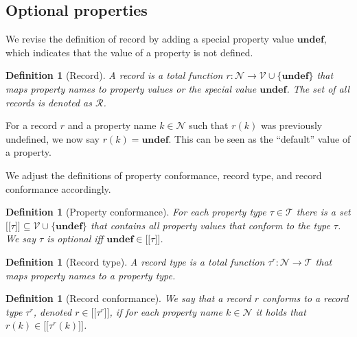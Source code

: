 \documentclass[a4paper]{article}
\newtheorem{definition}[theorem]{Definition}
\newcommand{\ptype}{\tau}
\newcommand{\ptypes}{\mathcal{T}}
\newcommand{\rtype}{\tau^r}
\newcommand{\lsem}{\ensuremath{[\![}}
\newcommand{\rsem}{\ensuremath{]\!]}}
\newcommand{\sem}[1]{\ensuremath{\lsem #1 \rsem}}
\newcommand{\undefined}{\mathbf{undef}}
\begin{document}
\subsection{Optional properties}

We revise the definition of record by adding a special property value $\undefined$, which indicates that the value of a property is not defined.

\begin{definition}[Record]
  A \emph{record} is a total function $r : \mathcal{N} \to \mathcal{V} \cup \{\undefined\}$ that maps property names to property values or the special value $\undefined$. The set of all records is denoted as $\mathcal{R}$.
\end{definition}

For a record $r$ and a property name $k \in \mathcal{N}$ such that $r(k)$ was previously undefined, we now say $r(k) = \undefined$. This can be seen as the ``default'' value of a property.

We adjust the definitions of property conformance, record type, and record conformance accordingly.

\begin{definition}[Property conformance]
  For each property type $\ptype \in \ptypes$ there is a set $\sem{\ptype} \subseteq \mathcal{V} \cup \{\undefined\}$ that contains all property values that \emph{conform} to the type $\ptype$. We say $\ptype$ is \emph{optional} iff $\undefined \in \sem{\ptype}$.
\end{definition}

\begin{definition}[Record type]
  A \emph{record type} is a total function $\rtype : \mathcal{N} \to \ptypes$ that maps property names to a property type.
\end{definition}

\begin{definition}[Record conformance]
  We say that a record $r$ \emph{conforms} to a record type $\rtype$, denoted $r \in \sem{\rtype}$, if for each property name $k \in \mathcal{N}$ it holds that $r(k) \in \sem{\rtype(k)}$.
\end{definition}

\end{document}
